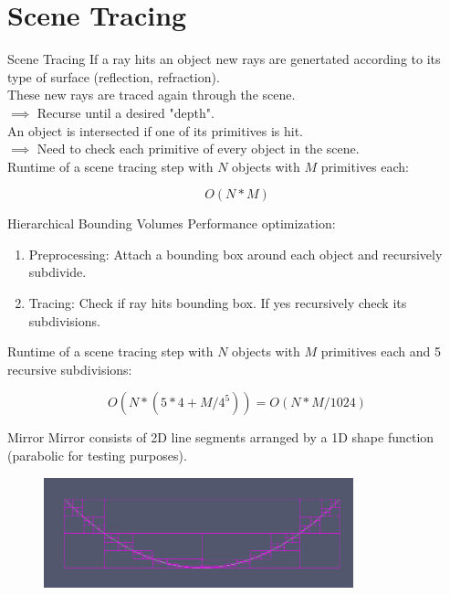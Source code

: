 \documentclass[aspectratio=43,t]{beamer}
\begin{document}
	\section{Scene Tracing}

    \begin{frame}[fragile]{Scene Tracing}
			If a ray hits an object new rays are genertated according to its type
			of surface (reflection, refraction).\\
			\bigskip
			These new rays are traced again through the scene.\\
			\bigskip
			$\implies$ Recurse until a desired "depth".\\
			\bigskip
			An object is intersected if one of its primitives is hit.\\
			\bigskip
			$\implies$ Need to check each primitive of every object in the scene.\\
			\bigskip
			Runtime of a scene tracing step with $N$ objects with $M$ primitives each:

			\begin{equation*}
				O(N * M)
			\end{equation*}
    \end{frame}

    \begin{frame}[fragile]{Hierarchical Bounding Volumes}
			Performance optimization:\\
			\bigskip
      \begin{enumerate}
				\item<2-> Preprocessing: Attach a bounding box around each object and 
					recursively subdivide.
				\item<3-> Tracing: Check if ray hits bounding box. If yes recursively check its
					subdivisions.
      \end{enumerate}
			\bigskip
			Runtime of a scene tracing step with $N$ objects with $M$ primitives each
			and 5 recursive subdivisions:

			\begin{equation*}
				O(N * (5*4 + M/4^5)) = O(N * M/1024)
			\end{equation*}
    \end{frame}

    \begin{frame}[fragile]{Mirror}
			Mirror consists of 2D line segments arranged by a 1D shape function (parabolic for testing
			purposes).

			\begin{figure}
			\centering
			\includegraphics[width=0.8\textwidth]{images/mirror.png}
			\end{figure}

    \end{frame}
\end{document}
